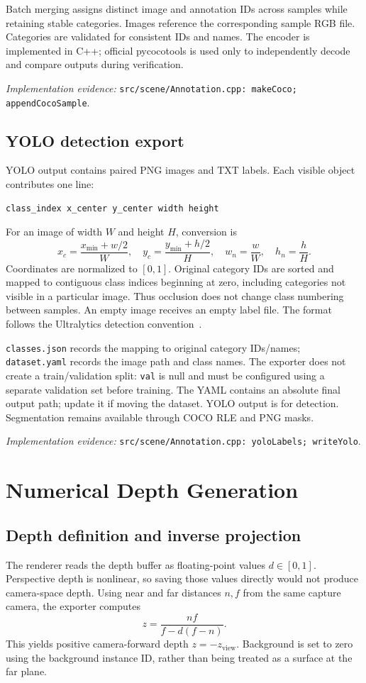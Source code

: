\documentclass[12pt,a4paper]{article}
\newcommand{\code}[1]{{\small\nolinkurl{#1}}}
\newcommand{\source}[1]{\par{\raggedright\footnotesize\textit{Implementation evidence:} \code{#1}.\par}}
\begin{document}
Batch merging assigns distinct image and annotation IDs across samples while retaining stable categories. Images reference the corresponding sample RGB file. Categories are validated for consistent IDs and names. The encoder is implemented in C++; official pycocotools is used only to independently decode and compare outputs during verification.
\source{src/scene/Annotation.cpp: makeCoco; appendCocoSample}

\subsection{YOLO detection export}
YOLO output contains paired PNG images and TXT labels. Each visible object contributes one line:
\begin{lstlisting}
class_index x_center y_center width height
\end{lstlisting}
For an image of width $W$ and height $H$, conversion is
\begin{equation}
x_c=\frac{x_{\min}+w/2}{W},\quad y_c=\frac{y_{\min}+h/2}{H},\quad
w_n=\frac{w}{W},\quad h_n=\frac{h}{H}.
\end{equation}
Coordinates are normalized to $[0,1]$. Original category IDs are sorted and mapped to contiguous class indices beginning at zero, including categories not visible in a particular image. Thus occlusion does not change class numbering between samples. An empty image receives an empty label file. The format follows the Ultralytics detection convention~\cite{yolo}.

\code{classes.json} records the mapping to original category IDs/names; \code{dataset.yaml} records the image path and class names. The exporter does not create a train/validation split: \code{val} is null and must be configured using a separate validation set before training. The YAML contains an absolute final output path; update it if moving the dataset. YOLO output is for detection. Segmentation remains available through COCO RLE and PNG masks.
\source{src/scene/Annotation.cpp: yoloLabels; writeYolo}

\section{Numerical Depth Generation}
\subsection{Depth definition and inverse projection}
The renderer reads the depth buffer as floating-point values $d\in[0,1]$. Perspective depth is nonlinear, so saving those values directly would not produce camera-space depth. Using near and far distances $n,f$ from the same capture camera, the exporter computes
\begin{equation}
z=\frac{nf}{f-d(f-n)}.
\end{equation}
This yields positive camera-forward depth $z=-z_{\mathrm{view}}$. Background is set to zero using the background instance ID, rather than being treated as a surface at the far plane.
\end{document}
